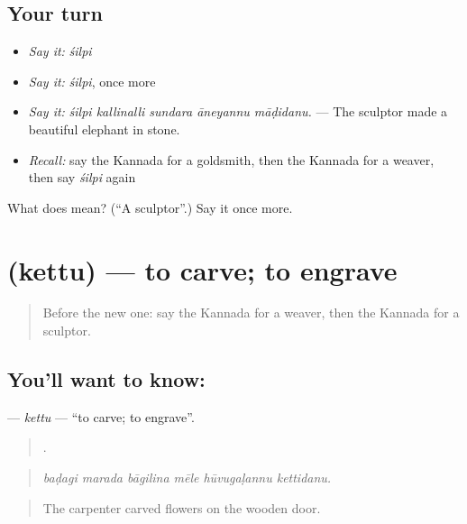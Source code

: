 \subsection*{Your turn}
\begin{itemize}
\raggedright
  \item \emph{Say it:} \emph{śilpi}
  \item \emph{Say it:} \emph{śilpi}, once more
  \item \emph{Say it:} \emph{śilpi kallinalli sundara āneyannu māḍidanu.} — The sculptor made a beautiful elephant in stone.
  \item \emph{Recall:} say the Kannada for a goldsmith, then the Kannada for a weaver, then say \emph{śilpi} again
\end{itemize}

\begin{tcolorbox}[breakable,colback=teal!4,colframe=teal!35!black,title={Before you move on}]
What does  mean? (\textquotedblleft{}A sculptor\textquotedblright{}.) Say it once more.
\end{tcolorbox}
\section[\texorpdfstring{\kn{ಕೆತ್ತು} (kettu)}{ಕೆತ್ತು (kettu)}]{ (kettu) — to carve; to engrave}

\label{lesson:KA-C522-kettu}



\begin{quote}
Before the new one: say the Kannada for a weaver, then the Kannada for a sculptor.
\end{quote}

\subsection*{You'll want to know: }
\textbf{} — \emph{kettu} — \textquotedblleft{}to carve; to engrave\textquotedblright{}.

\begin{quote}
     .
\end{quote}

\begin{quote}
\emph{baḍagi marada bāgilina mēle hūvugaḷannu kettidanu.}
\end{quote}

\begin{quote}
The carpenter carved flowers on the wooden door.
\end{quote}

